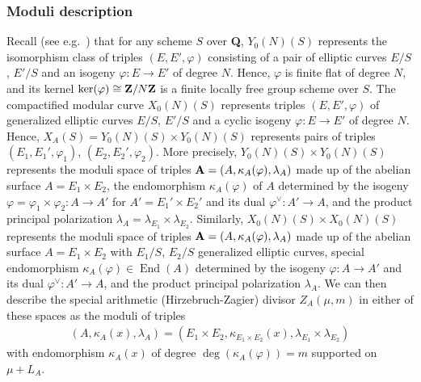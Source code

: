 \documentclass{amsart}
\theoremstyle{definition}
\theoremstyle{definition}
\theoremstyle{definition}
\begin{document}
\subsubsection{Moduli description}

Recall (see e.g.~\cite{GZ}) that for any scheme $S$ over {\bf{Q}}, $Y_0(N)(S)$ represents the isomorphism class of triples $(E, E', \varphi)$
consisting of a pair of elliptic curves $E/S$, $E'/S$ and an isogeny $\varphi: E \rightarrow E'$ of degree $N$.
Hence, $\varphi$ is finite flat of degree $N$, and its kernel $\ker(\varphi) \cong {\bf{Z}} / N{\bf{Z}}$ is a finite locally free group scheme over $S$.
The compactified modular curve $X_0(N)(S)$ represents triples $(E, E', \varphi)$ of generalized elliptic curves $E/S$, $E'/S$ and a cyclic isogeny $\varphi: E \rightarrow E'$ of degree $N$. 
Hence, $X_A(S) = Y_0(N)(S) \times Y_0(N)(S)$ represents pairs of triples $(E_1, E_1', \varphi_1)$, $(E_2, E_2', \varphi_2)$. 
More precisely, $Y_0(N)(S) \times Y_0(N)(S)$ represents the 
moduli space of triples ${\bf{A}} = (A, \kappa_A(\varphi), \lambda_A)$ made up of the abelian surface $A = E_1 \times E_2$, the endomorphism
$\kappa_A(\varphi)$ of $A$ determined by the isogeny $\varphi = \varphi_1 \times \varphi_2: A \rightarrow A'$ for $A' = E_1' \times E_2'$ 
and its dual $\varphi^{\vee}: A' \rightarrow A$, and the product principal polarization $\lambda_A = \lambda_{E_1} \times \lambda_{E_2}$.
Similarly, $X_0(N)(S) \times X_0(N)(S)$ represents the 
moduli space of triples ${\bf{A}} = (A, \kappa_A(\varphi), \lambda_A)$ made up of the abelian surface $A = E_1 \times E_2$
with $E_1/S$, $E_2/S$ generalized elliptic curves, special endomorphism $\kappa_A(\varphi) \in \operatorname{End}(A)$
determined by the isogeny $\varphi: A \rightarrow A'$ and its dual $\varphi^{\vee}: A'\rightarrow A$, and the product principal 
polarization $\lambda_A$. We can then describe the special arithmetic (Hirzebruch-Zagier) divisor $Z_A(\mu, m)$ in either 
of these spaces as the moduli of triples 
\begin{align*}(A, \kappa_A(x), \lambda_A) = (E_1 \times E_2, \kappa_{E_1 \times E_2}(x), \lambda_{E_1} \times \lambda_{E_2})\end{align*}
with endomorphism $\kappa_A(x)$ of degree $\deg(\kappa_A(\varphi)) = m$ supported on $\mu + L_A$. 
\end{document}
